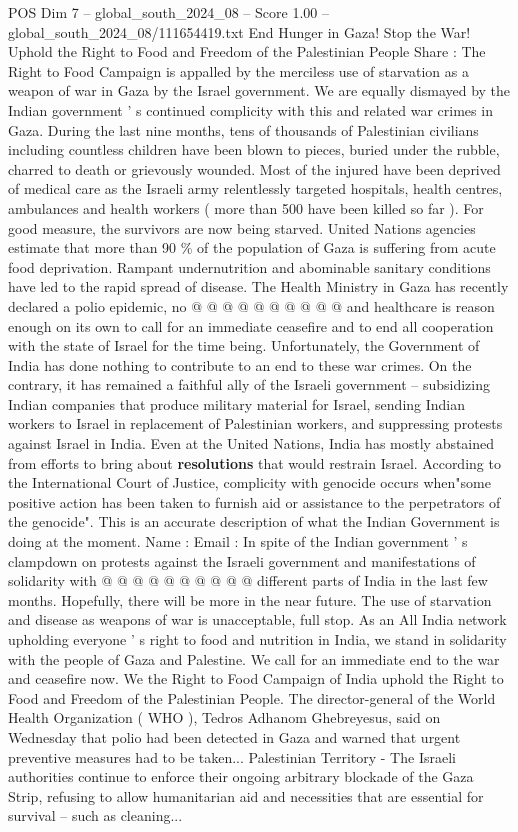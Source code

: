 \begin{textsample}{POS Dim 7 – global\_south\_2024\_08 – Score 1.00 – global\_south\_2024\_08/111654419.txt}  \label{ex:f7_pos_077}
End Hunger in Gaza!
Stop the War!
Uphold the Right to Food and Freedom of the Palestinian People Share : The Right to Food Campaign is appalled by the merciless use of starvation as a weapon of war in Gaza by the Israel government.
We are equally dismayed by the Indian government ' s continued complicity with this and related war crimes in Gaza.
During the last nine months, tens of thousands of Palestinian civilians including countless children have been blown to pieces, buried under the rubble, charred to death or grievously wounded.
Most of the injured have been deprived of medical care as the Israeli army relentlessly targeted hospitals, health centres, ambulances and health workers ( more than 500 have been killed so far ).
For good measure, the survivors are now being starved.
United Nations agencies estimate that more than 90 \% of the population of Gaza is suffering from acute food deprivation.
Rampant undernutrition and abominable sanitary conditions have led to the rapid spread of disease.
The Health Ministry in Gaza has recently declared a polio epidemic, no @ @ @ @ @ @ @ @ @ @ and healthcare is reason enough on its own to call for an immediate ceasefire and to end all cooperation with the state of Israel for the time being.
Unfortunately, the Government of India has done nothing to contribute to an end to these war crimes.
On the contrary, it has remained a faithful ally of the Israeli government -- subsidizing Indian companies that produce military material for Israel, sending Indian workers to Israel in replacement of Palestinian workers, and suppressing protests against Israel in India.
Even at the United Nations, India has mostly abstained from efforts to bring about \textbf{resolutions} that would restrain Israel.
According to the International Court of Justice, complicity with genocide occurs when"some positive action has been taken to furnish aid or assistance to the perpetrators of the genocide".
This is an accurate description of what the Indian Government is doing at the moment.
Name : Email : In spite of the Indian government ' s clampdown on protests against the Israeli government and manifestations of solidarity with @ @ @ @ @ @ @ @ @ @ different parts of India in the last few months.
Hopefully, there will be more in the near future.
The use of starvation and disease as weapons of war is unacceptable, full stop.
As an All India network upholding everyone ' s right to food and nutrition in India, we stand in solidarity with the people of Gaza and Palestine.
We call for an immediate end to the war and ceasefire now.
We the Right to Food Campaign of India uphold the Right to Food and Freedom of the Palestinian People.
The director-general of the World Health Organization ( WHO ), Tedros Adhanom Ghebreyesus, said on Wednesday that polio had been detected in Gaza and warned that urgent preventive measures had to be taken...
Palestinian Territory - The Israeli authorities continue to enforce their ongoing arbitrary blockade of the Gaza Strip, refusing to allow humanitarian aid and necessities that are essential for survival -- such as cleaning...

\end{textsample}
